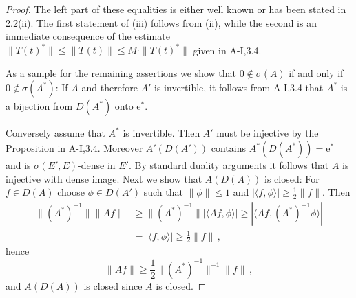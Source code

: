 \begin{proof}
The left part of these equalities is either well known or has been stated in 
2.2(ii).
The first statement of (iii) follows from (ii), while the second is an immediate consequence of the estimate $\|T(t)^*\| \leq \|T(t)\| \leq M\cdot\|T(t)^*\|$ given in A-I,3.4.

As a sample for the remaining assertions we show that $0 \notin \sigma(A)$ if and only if $0 \notin \sigma(A^*)$:
If $A$ and therefore $A'$ is invertible, it follows from A-I,3.4 that $A^*$ is a bijection from $D(A^*)$ onto $\mathrm{e}^*$.

Conversely assume that $A^*$ is invertible.
Then $A'$ must be injective by the Proposition in A-I,3.4.
Moreover $A'(D(A'))$ contains $A^*(D(A^*)) = \mathrm{e}^*$ and is $\sigma(E',E)$-dense in $E'$.
By standard duality arguments it follows that $A$ is injective with dense image.
Next we show that $A(D(A))$ is closed: For $f \in D(A)$ choose $\phi \in D(A')$ such that $\|\phi\| \leq 1$ and $|\langle f,\phi \rangle| \geq \frac{1}{2}\|f\|$.
Then
\begin{align*}
\|(A^*)^{-1}\| \|Af\| &\geq \|(A^*)^{-1}\| |\langle Af,\phi \rangle| \geq |\langle Af,(A^*)^{-1}\phi \rangle| \\
&= |\langle f,\phi \rangle| \geq \frac{1}{2}\|f\|\,,
\end{align*}
hence
\[
\|Af\| \geq \frac{1}{2}\|(A^*)^{-1}\|^{-1}\|f\|\,,
\]
and $A(D(A))$ is closed since $A$ is closed.
\end{proof}

